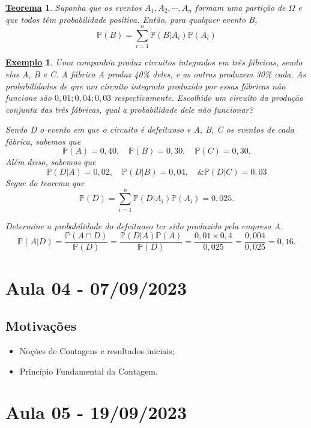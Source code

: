 \documentclass{article}
\newtheorem*{theorem*}{\underline{Teorema}}
\newtheorem{example}{\underline{Exemplo}}
\begin{document}
\begin{theorem*}
  Suponha que os eventos \(A_{1}, A_{2}, \cdots, A_{n}\) formam uma partição de \(\Omega \) e que todos têm probabilidade positiva. Então, para qualquer evento B, 
    \[
      \mathbb{P}(B) = \sum\limits_{i=1}^{n}\mathbb{P}(B|A_{i})\mathbb{P}(A_{i})
    \]
\end{theorem*}
\begin{example}
  Uma companhia produz circuitos integrados em três fábricas, sendo elas A, B e C. A fábrica A produz 40\% deles, e as outras produzem 30\% cada. As probabilidades de que um circuito integrado produzido por essas fábricas não funcione são 
 \(0,01; 0,04; 0,03\) respectivamente. Escolhido um circuito da produção conjunta das três fábricas, qual a probabilidade dele não funcionar? 
  
  Sendo D o evento em que o circuito é defeituoso e A, B, C os eventos de cada fábrica, sabemos que 
    \[
      \mathbb{P}(A) = 0,40,\quad \mathbb{P}(B) = 0,30,\quad \mathbb{P}(C) = 0,30.
    \]
    Além disso, sabemos que 
    \[
      \mathbb{P}(D|A) = 0,02,\quad \mathbb{P}(D|B) = 0,04,\quad \& \mathbb{P}(D|C) = 0,03
    \]
    Segue do teorema que 
      \[
        \mathbb{P}(D) = \sum\limits_{i=1}^{n}\mathbb{P}(D|A_{i})\mathbb{P}(A_{i}) = 0,025.
      \]

    Determine a probabilidade do defeituoso ter sido produzido pela empresa A. 
      \[
        \mathbb{P}(A|D) = \frac{\mathbb{P}(A\cap D)}{\mathbb{P}(D)} = \frac{\mathbb{P}(D|A)\mathbb{P}(A)}{\mathbb{P}(D)} = \frac{0,01\times 0,4}{0,025} = \frac{0,004}{0,025} = 0,16.
      \]
\end{example}
\newpage

\section{Aula 04 - 07/09/2023}
\subsection{Motivações}
\begin{itemize}
  \item Noções de Contagens e resultados iniciais;
  \item Princípio Fundamental da Contagem.
\end{itemize}

\newpage

\section{Aula 05 - 19/09/2023}
\end{document}
